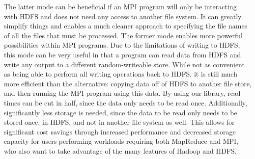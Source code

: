 The latter mode can be beneficial if an MPI program will only be interacting
with HDFS and does not need any access to another file system. It can greatly
simplify things and enables a much cleaner approach to specifying the file names
of all the files that must be processed. The former mode enables more powerful
possibilities within MPI programs. Due to the limitations of writing to HDFS,
this mode can be very useful in that a program can read data from HDFS and write
any output to a different random-writeable store. While not as convenient as
being able to perform all writing operations back to HDFS, it is still much more
efficient than the alternative: copying data off of HDFS to another file store,
and then running the MPI program using this data. By using our library, read
times can be cut in half, since the data only needs to be read once.
Additionally, significantly less storage is needed, since the data to be read
only needs to be stored once, in HDFS, and not in another file system as well.
This allows for significant cost savings through increased performance and
decreased storage capacity for users performing workloads requiring both
MapReduce and MPI, who also want to take advantage of the many features of
Hadoop and HDFS.
